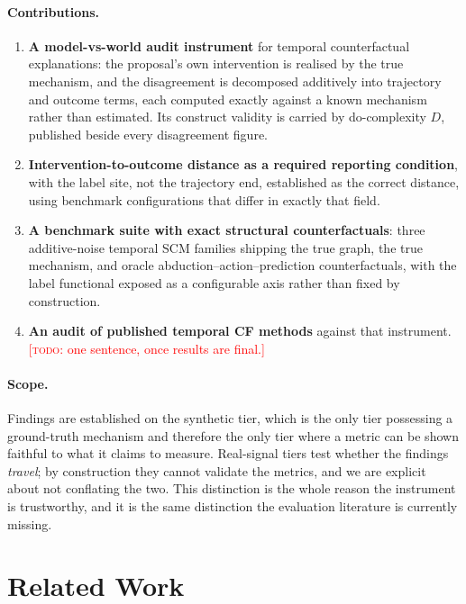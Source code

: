\documentclass{article}
\newcommand{\todo}[1]{\textcolor{red}{[\textsc{todo}: #1]}}
\begin{document}
\paragraph{Contributions.}
\begin{enumerate}
  \item \textbf{A model-vs-world audit instrument} for temporal counterfactual explanations: the proposal's own intervention is realised by the true mechanism, and the disagreement is decomposed additively into trajectory and outcome terms, each computed exactly against a known mechanism rather than estimated. Its construct validity is carried by do-complexity $D$, published beside every disagreement figure.
  \item \textbf{Intervention-to-outcome distance as a required reporting condition}, with the label site, not the trajectory end, established as the correct distance, using benchmark configurations that differ in exactly that field.
  \item \textbf{A benchmark suite with exact structural counterfactuals}: three additive-noise temporal SCM families shipping the true graph, the true mechanism, and oracle abduction--action--prediction counterfactuals, with the label functional exposed as a configurable axis rather than fixed by construction.
  \item \textbf{An audit of published temporal CF methods} against that instrument. \todo{one sentence, once results are final.}
\end{enumerate}

\paragraph{Scope.} Findings are established on the synthetic tier, which is the only tier possessing a ground-truth mechanism and therefore the only tier where a metric can be shown faithful to what it claims to measure. Real-signal tiers test whether the findings \emph{travel}; by construction they cannot validate the metrics, and we are explicit about not conflating the two. This distinction is the whole reason the instrument is trustworthy, and it is the same distinction the evaluation literature is currently missing.

\section{Related Work}
\end{document}
